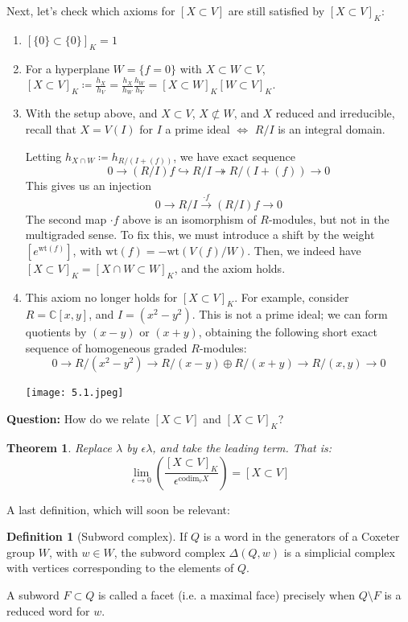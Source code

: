 \documentclass[12pt]{amsart}
\numberwithin{equation}{section}
\newtheorem{Theorem}[equation]{Theorem}
\theoremstyle{definition}
\newtheorem{Definition}[equation]{Definition}
\numberwithin{figure}{section}
\newcommand{\wt}{\text{wt}}
\newcommand{\C}{\mathbb{C}}
\begin{document}
\noindent Next, let's check which axioms for $[X \subset V]$ are still satisfied by $[X \subset V]_K$:
\begin{enumerate}
    \item[\checkmark (0)] $[\{0\} \subset \{0\}]_K = 1$
    \item [\checkmark (2)] For a hyperplane $W = \{f=0\}$ with $X \subset W \subset V$, $[X \subset V]_K \coloneqq \frac{h_X}{h_V} = \frac{h_X}{h_W} \frac{h_W}{h_V} = [X \subset W]_K [W \subset V]_K$.
    \item[\checkmark (1)] With the setup above, and $X \subset V$, $X \not \subset W$, and $X$ reduced and irreducible, recall that $X = V(I)$ for $I$ a prime ideal $\iff$ $R/I$ is an integral domain.
    
    Letting $h_{X \cap W} \coloneqq h_{R/(I+(f))}$, we have exact sequence
    $$ 0 \to (R/I)f \hookrightarrow R/I \twoheadrightarrow R/(I + (f)) \to 0 $$
    This gives us an injection
    $$ 0 \to R/I \stackrel{\cdot f}{\to} (R/I)f \to 0 $$
    The second map $\cdot f$ above is an isomorphism of $R$-modules, but not in the multigraded sense. To fix this, we must introduce a shift by the weight $[e^{\wt(f)}]$, with $\wt(f) = -\wt(V(f)/W)$.
    Then, we indeed have $[X \subset V]_K = [X \cap W \subset W]_K$, and the axiom holds.
    
    \item[$\bigtimes$ \, (3)] This axiom no longer holds for $[X \subset V]_K$. For example, consider $R = \C[x,y]$, and $I = (x^2 - y^2)$. This is not a prime ideal; we can form quotients by $(x-y)$ or $(x+y)$, obtaining the following short exact sequence of    homogeneous graded $R$-modules:
    $$ 0 \to R/(x^2-y^2) \to R/(x-y) \oplus R/(x+y) \to R/(x,y) \to 0 $$
\centerline{\texttt{[image: 5.1.jpeg]}}

\end{enumerate}
\vspace{1em}
\textbf{Question:} How do we relate $[X \subset V]$ and $[X \subset V]_K$?
\begin{Theorem}
Replace $\lambda$ by $\epsilon \lambda$, and take the leading term. That is:
$$ \lim_{\epsilon \to 0} \left( \frac{[X \subset V]_K}{\epsilon^{\text{codim}_v X}} \right) = [X \subset V] $$
\end{Theorem}

A last definition, which will soon be relevant:

\begin{Definition}[Subword complex]
If $Q$ is a word in the generators of a Coxeter group $W$, with $w \in W$, the subword complex $\Delta(Q,w)$ is a simplicial complex with vertices corresponding to the elements of $Q$.

A subword $F \subset Q$ is called a facet (i.e. a maximal face) precisely when $Q \setminus F$ is a reduced word for $w$.
\end{Definition}
\end{document}
